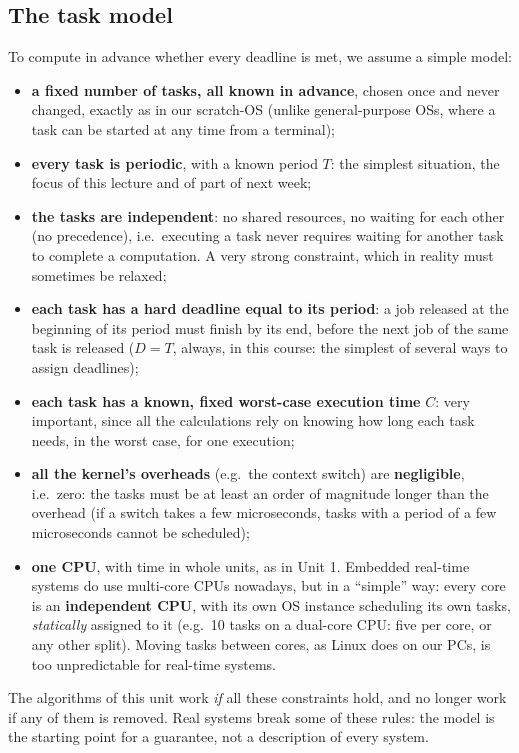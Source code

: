 \subsection{The task model}
To compute in advance whether every deadline is met, we assume a simple model:
\begin{itemize}
    \item \textbf{a fixed number of tasks, all known in advance}, chosen once and never changed, exactly as in our scratch-OS (unlike general-purpose OSs, where a task can be started at any time from a terminal);
    \item \textbf{every task is periodic}, with a known period $T$: the simplest situation, the focus of this lecture and of part of next week;
    \item \textbf{the tasks are independent}: no shared resources, no waiting for each other (no precedence), i.e.\ executing a task never requires waiting for another task to complete a computation. A very strong constraint, which in reality must sometimes be relaxed;
    \item \textbf{each task has a hard deadline equal to its period}: a job released at the beginning of its period must finish by its end, before the next job of the same task is released ($D = T$, always, in this course: the simplest of several ways to assign deadlines);
    \item \textbf{each task has a known, fixed worst-case execution time} $C$: very important, since all the calculations rely on knowing how long each task needs, in the worst case, for one execution;
    \item \textbf{all the kernel's overheads} (e.g.\ the context switch) are \textbf{negligible}, i.e.\ zero: the tasks must be at least an order of magnitude longer than the overhead (if a switch takes a few microseconds, tasks with a period of a few microseconds cannot be scheduled);
    \item \textbf{one CPU}, with time in whole units, as in Unit 1. Embedded real-time systems do use multi-core CPUs nowadays, but in a ``simple'' way: every core is an \textbf{independent CPU}, with its own OS instance scheduling its own tasks, \emph{statically} assigned to it (e.g.\ 10 tasks on a dual-core CPU: five per core, or any other split). Moving tasks between cores, as Linux does on our PCs, is too unpredictable for real-time systems.
\end{itemize}
The algorithms of this unit work \emph{if} all these constraints hold, and no longer work if any of them is removed. Real systems break some of these rules: the model is the starting point for a guarantee, not a description of every system.

